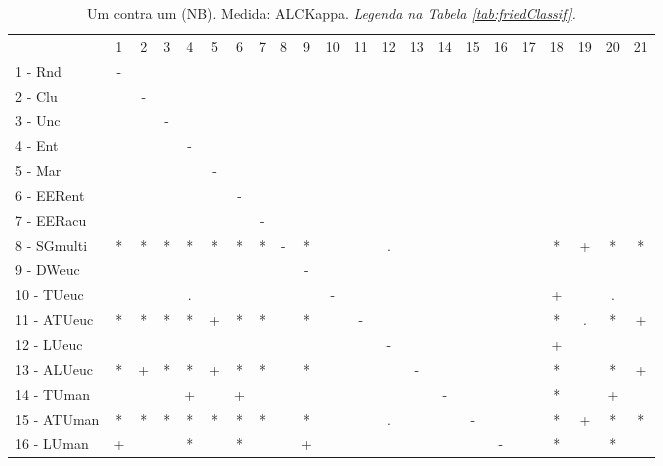 \begin{table}[h]
\caption{Um contra um (NB). Medida: ALCKappa. \textit{Legenda na Tabela \ref{tab:friedClassif}.}}
\begin{center}\begin{tabular}{lcc|cc|cc|cc|cc|cc|cc|cc|cc|cc|c}
 			& 1 & 2 & 3 & 4 & 5 & 6 & 7 & 8 & 9 & 10 & 11 & 12 & 13 & 14 & 15 & 16 & 17 & 18 & 19 & 20 & 21\\
1 - Rnd  	& - &   &   &   &   &   &   &   &   &   &   &   &   &   &   &   &   &   &   &   &   \\
2 - Clu  	&   & - &   &   &   &   &   &   &   &   &   &   &   &   &   &   &   &   &   &   &   \\ \hline
3 - Unc  	&   &   & - &   &   &   &   &   &   &   &   &   &   &   &   &   &   &   &   &   &   \\
4 - Ent  	&   &   &   & - &   &   &   &   &   &   &   &   &   &   &   &   &   &   &   &   &   \\ \hline
5 - Mar  	&   &   &   &   & - &   &   &   &   &   &   &   &   &   &   &   &   &   &   &   &   \\
6 - EERent	&   &   &   &   &   & - &   &   &   &   &   &   &   &   &   &   &   &   &   &   &   \\ \hline
7 - EERacu	&   &   &   &   &   &   & - &   &   &   &   &   &   &   &   &   &   &   &   &   &   \\
8 - SGmulti	& * & * & * & * & * & * & * & - & * &   &   & . &   &   &   &   &   & * & + & * & * \\ \hline
9 - DWeuc	&   &   &   &   &   &   &   &   & - &   &   &   &   &   &   &   &   &   &   &   &   \\
10 - TUeuc	&   &   &   & . &   &   &   &   &   & - &   &   &   &   &   &   &   & + &   & . &   \\ \hline
11 - ATUeuc	& * & * & * & * & + & * & * &   & * &   & - &   &   &   &   &   &   & * & . & * & + \\
12 - LUeuc	&   &   &   &   &   &   &   &   &   &   &   & - &   &   &   &   &   & + &   &   &   \\ \hline
13 - ALUeuc	& * & + & * & * & + & * & * &   & * &   &   &   & - &   &   &   &   & * &   & * & + \\
14 - TUman	&   &   &   & + &   & + &   &   &   &   &   &   &   & - &   &   &   & * &   & + &   \\ \hline
15 - ATUman	& * & * & * & * & * & * & * &   & * &   &   & . &   &   & - &   &   & * & + & * & * \\
16 - LUman	& + &   &   & * &   & * &   &   & + &   &   &   &   &   &   & - &   & * &   & * &   \\ \hline

\end{tabular}
\end{center}
\end{table}

